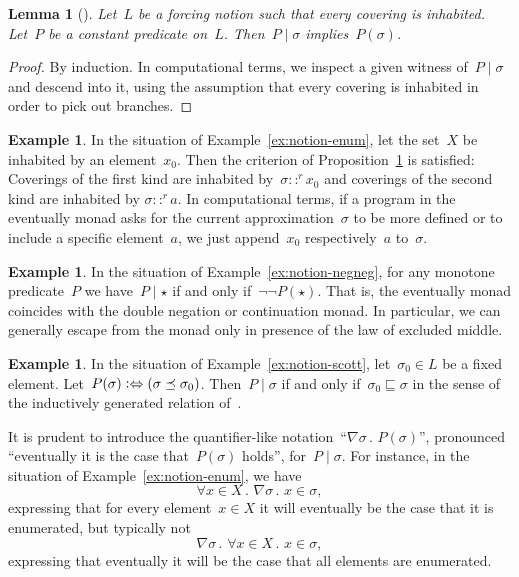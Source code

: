 \documentclass[com,11pt,crcready]{iosart2x}
\theoremstyle{definition}
\newtheorem{example}[definition]{Example}
\theoremstyle{plain}
\newtheorem{lemma}[definition]{Lemma}
\theoremstyle{remark}
\renewcommand{\_}{\mathpunct{.}\,}
\begin{document}
\begin{lemma}[{\cite[Proposition~V.3.2]{joyal-tierney:grothendieck}}]\label{prop:cov-open}
Let~$L$ be a forcing notion such that every covering is inhabited. Let~$P$ be a
constant predicate on~$L$. Then~$P \mid \sigma$ implies~$P(\sigma)$.
\end{lemma}

\begin{proof}By induction. In computational terms, we inspect a given witness
of~$P \mid \sigma$ and descend into it, using the assumption that every
covering is inhabited in order to pick out branches.
\end{proof}

\begin{example}In the situation of Example~\ref{ex:notion-enum}, let the
set~$X$ be inhabited by an element~$x_0$. Then the criterion of
Proposition~\ref{prop:cov-open} is satisfied: Coverings of the first kind are
inhabited by~$\sigma ::^r x_0$ and coverings of the second kind are inhabited
by $\sigma ::^r a$. In computational terms, if a program in the eventually
monad asks for the current approximation~$\sigma$ to be more defined or to include a
specific element~$a$, we just append~$x_0$ respectively~$a$ to~$\sigma$.
\end{example}

\begin{example}In the situation of Example~\ref{ex:notion-negneg}, for any
monotone predicate~$P$ we have~$P \mid \star$ if and only if~$\neg\neg
P(\star)$. That is, the eventually monad coincides with the double negation or
continuation monad. In particular, we can generally escape from the monad only
in presence of the law of excluded middle.\end{example}

\begin{example}In the situation of Example~\ref{ex:notion-scott},
let~$\sigma_0 \in L$ be a fixed element. Let~$P(\sigma)
\vcentcolon\Leftrightarrow (\sigma \preceq \sigma_0)$. Then~$P \mid \sigma$ if
and only if~$\sigma_0 \sqsubseteq \sigma$ in the sense of the inductively
generated relation of~\cite[Definition~18]{wessel-schuster:radical}.\end{example}

It is prudent to introduce the quantifier-like notation~``$\nabla \sigma\_
P(\sigma)$'', pronounced ``eventually it is the case that~$P(\sigma)$ holds'',
for~$P \mid \sigma$. For instance, in the situation of
Example~\ref{ex:notion-enum}, we have
\[ \forall x \in X\_ \nabla \sigma\_ x \in \sigma, \]
expressing that for every element~$x \in X$ it will eventually be the case that
it is enumerated, but typically not
\[ \nabla \sigma\_ \forall x \in X\_ x \in \sigma, \]
expressing that eventually it will be the case that all elements are
enumerated.
\end{document}
